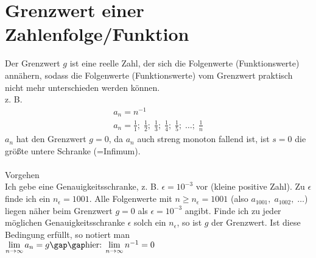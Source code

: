 \section{Grenzwert einer Zahlenfolge/Funktion}
Der Grenzwert $g$ ist eine reelle Zahl, der sich die Folgenwerte (Funktionswerte) annähern, sodass die Folgenwerte (Funktionswerte) vom Grenzwert praktisch nicht mehr unterschieden werden können. \\
z. B.
\begin{gather*}
  a_n = n^{-1} \\
  a_n = \frac{1}{1};\; \frac{1}{2};\; \frac{1}{3};\; \frac{1}{4};\; \frac{1}{5};\; \dots;\; \frac{1}{n}
\end{gather*}
$a_n$ hat den Grenzwert $g = 0$, da $a_n$ auch streng monoton fallend ist, ist $s = 0$ die größte untere Schranke (=\glqq Infimum\grqq). \\\\
Vorgehen \\
Ich gebe eine Genauigkeitsschranke, z. B. $\epsilon = 10^{-3}$ vor (kleine positive Zahl). Zu $\epsilon$ finde ich ein $n_\epsilon = 1001$. Alle Folgenwerte mit $n \geq n_\epsilon = 1001$ (also $a_{1001},\; a_{1002},\; \dots$) liegen näher beim Grenzwert $g = 0$ als $\epsilon = 10^{-3}$ angibt. Finde ich zu jeder möglichen Genauigkeitsschranke $\epsilon$ solch ein $n_\epsilon$, so ist $g$ der Grenzwert. Ist diese Bedingung erfüllt, so notiert man \\
$\lim\limits_{n \to \infty} a_n = g\gap\gap \text{hier:}\; \lim\limits_{n \to \infty} n^{-1} = 0$
\newpage
